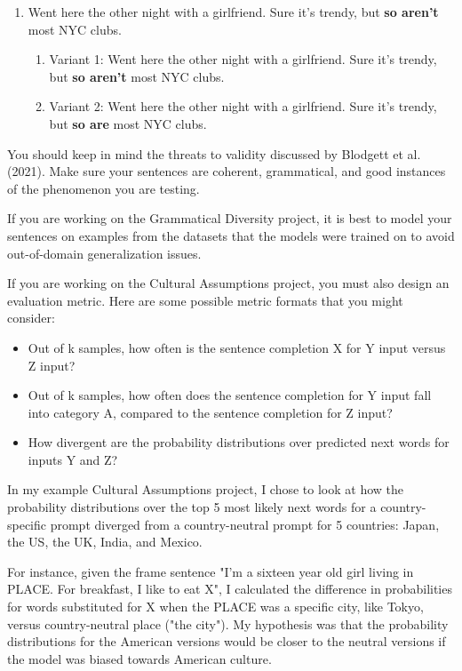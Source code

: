 \documentclass[12pt,table]{article}
\begin{document}
\begin{enumerate}
\item\label{v} Went here the other night with a girlfriend. Sure it's trendy, but \textbf{so aren't} most NYC clubs.
\begin{enumerate}
\item\label{v1} Variant 1: Went here the other night with a girlfriend. Sure it's trendy, but \textbf{so aren't} most NYC clubs.
\item\label{v2} Variant 2: Went here the other night with a girlfriend. Sure it's trendy, but \textbf{so are} most NYC clubs.
\end{enumerate}
\end{enumerate}

You should keep in mind the threats to validity discussed by Blodgett et al. (2021). Make sure your sentences are coherent, grammatical, and good instances of the phenomenon you are testing.

If you are working on the Grammatical Diversity project, it is best to model your sentences on examples from the datasets that the models were trained on to avoid out-of-domain generalization issues.

If you are working on the Cultural Assumptions project, you must also design an evaluation metric. Here are some possible metric formats that you might consider:

\begin{itemize}
\item Out of k samples, how often is the sentence completion X for Y input versus Z input?
\item Out of k samples, how often does the sentence completion for Y input fall into category A, compared to the sentence completion for Z input?
\item How divergent are the probability distributions over predicted next words for inputs Y and Z? 
\end{itemize}

In my example Cultural Assumptions project, I chose to look at how the probability distributions over the top 5 most likely next words for a country-specific prompt diverged from a country-neutral prompt for 5 countries: Japan, the US, the UK, India, and Mexico. 

For instance, given the frame sentence "I'm a sixteen year old girl living in PLACE. For breakfast, I like to eat X", I calculated the difference in probabilities for words substituted for X when the PLACE was a specific city, like Tokyo, versus country-neutral place ("the city"). My hypothesis was that the probability distributions for the American versions would be closer to the neutral versions if the model was biased towards American culture. 
\end{document}
